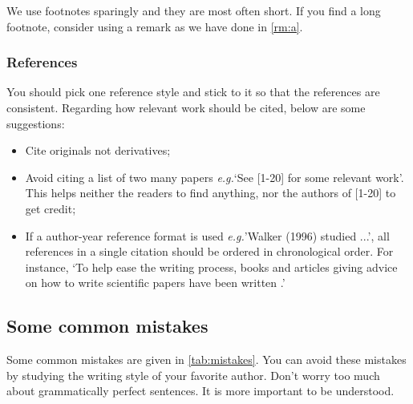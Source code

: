 \documentclass[authoryear,3p,times,preprint,review,fleqn]{elsarticle}
\newcommand{\eg}{\textit{e.g.}\xspace}
\numberwithin{equation}{section}
\theoremstyle{remark}
\begin{document}
We use footnotes sparingly and they are most often short. If you find a long footnote, consider using a remark as we have done in \cref{rm:a}.

\subsubsection{References}\label{sec:references}

You should pick one reference style and stick to it so that the references are consistent. Regarding how relevant work should be cited, below are some suggestions:

\begin{itemize}
\item Cite originals not derivatives;
\item Avoid citing a list of two many papers \eg `See [1-20] for some relevant work'. This helps neither the readers to find anything, nor the authors of [1-20] to get credit;
\item If a author-year reference format is used \eg 'Walker (1996) studied ...', all references in a single citation should be ordered in chronological order. For instance, `To help ease the writing process, books and articles giving advice on how to write scientific papers have been written \citep{day1998write,ashby2000write,plaxco2010art}.'
\end{itemize}

% 
\subsection{Some common mistakes}\label{sec:mistakes}


Some common mistakes are given in \cref{tab:mistakes}. You can avoid these mistakes by studying the writing style of your favorite author. Don't worry too much about grammatically perfect sentences. It is more important to be understood. \\
\end{document}
